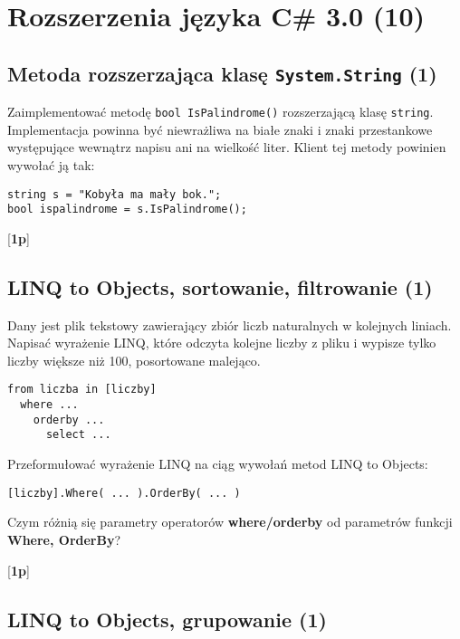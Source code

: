 ﻿\section{Rozszerzenia języka C\# 3.0 (10)}

\subsection{Metoda rozszerzająca klasę {\tt System.String} (1)}

  Zaimplementować metodę {\tt bool IsPalindrome()} rozszerzającą klasę {\tt string}. Implementacja powinna być niewrażliwa na białe znaki i znaki
\label{rozszerzenie_string}  
  przestankowe występujące
  wewnątrz napisu ani na wielkość liter.
  Klient tej metody powinien wywołać ją tak:
  \begin{verbatim}
string s = "Kobyła ma mały bok.";
bool ispalindrome = s.IsPalindrome();
  \end{verbatim}

  [{\bf 1p}]

\subsection{LINQ to Objects, sortowanie, filtrowanie (1)}

  Dany jest plik tekstowy zawierający zbiór liczb naturalnych w kolejnych liniach.
\label{linq_to_objects}  
  Napisać wyrażenie LINQ, które odczyta kolejne liczby z pliku i wypisze tylko
  liczby większe niż 100, posortowane malejąco.
  
\begin{verbatim}  
from liczba in [liczby]
  where ...
    orderby ...
      select ...
\end{verbatim}  
  
  Przeformułować wyrażenie LINQ na ciąg wywołań metod LINQ to Objects:

\begin{verbatim}  
[liczby].Where( ... ).OrderBy( ... )
\end{verbatim}  

  Czym różnią się parametry operatorów {\bf where/orderby} od parametrów
  funkcji {\bf Where, OrderBy}?

  [{\bf 1p}]

\subsection{LINQ to Objects, grupowanie (1)}

